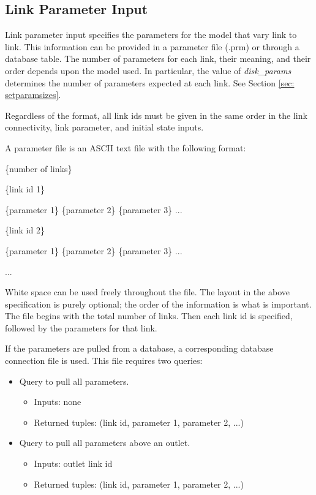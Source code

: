 \documentclass[12pt]{article}
\newenvironment{codeindent}
{\begin{list}{}
        {\setlength{\leftmargin}{.1in}}
        \item[]
}
{\end{list}}
\begin{document}
\subsection{Link Parameter Input} \label{sec: link parameter input}

Link parameter input specifies the parameters for the model that vary link to link. This information can be provided in a parameter file (.prm) or through a database table. The number of parameters for each link, their meaning, and their order depends upon the model used. In particular, the value of \emph{disk\_params} determines the number of parameters expected at each link. See Section \ref{sec: setparamsizes}.

Regardless of the format, all link ids must be given in the same order in the link connectivity, link parameter, and initial state inputs.

A parameter file is an ASCII text file with the following format:
\begin{codeindent}
 \{number of links\}
 
 \{link id 1\}
 
 \{parameter 1\} \{parameter 2\} \{parameter 3\} ...
 
 \{link id 2\}
 
 \{parameter 1\} \{parameter 2\} \{parameter 3\} ...
 
 ...
\end{codeindent}
White space can be used freely throughout the file. The layout in the above specification is purely optional; the order of the information is what is important. The file begins with the total number of links. Then each link id is specified, followed by the parameters for that link.

If the parameters are pulled from a database, a corresponding database connection file is used. This file requires two queries:
\begin{itemize}
 \item Query to pull all parameters. 
  \begin{itemize}
   \item Inputs: none
   \item Returned tuples: (link id, parameter 1, parameter 2, ...)
  \end{itemize}
 \item Query to pull all parameters above an outlet.
  \begin{itemize}
   \item Inputs: outlet link id
   \item Returned tuples: (link id, parameter 1, parameter 2, ...)
  \end{itemize}
\end{itemize}
\end{document}
